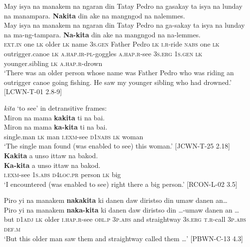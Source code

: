 \ea
May  isya  na  manakem  na  ngaran  din  Tatay  Pedro  na gasakay ta  isya  na  lunday  na  manampara. \textbf{Nakita}  din  ake  na  mangngod  na  nalemmes. \\\smallskip
\gll May  isya  na  manakem  na  ngaran  din  Tatay  Pedro  na ga-sakay ta  isya  na  lunday  na  ma-ng-tampara. \textbf{Na-kita}  din  ake  na  mangngod  na  na-lemmes. \\
\textsc{ext.in}  one  \textsc{lk}  older  \textsc{lk}  name  3\textsc{s.gen}  Father  Pedro  \textsc{lk}
\textsc{i.r}-ride   \textsc{nabs}  one  \textsc{lk}  outrigger.canoe  \textsc{lk}  \textsc{a.hap.ir-pl}-goggles
\textsc{a.hap.r}-see  3\textsc{s.erg}
1\textsc{s.gen} \textsc{lk}  younger.sibling  \textsc{lk}  \textsc{a.hap.r}-drown \\
\glt `There was an older person whose name was Father Pedro who was riding an outrigger canoe going fishing. He saw my younger sibling who had drowned.’ [LCWN-T-01 2.8-9]
\z

\ea
\textit{kita} ‘to see’ in detransitive frames: \\
Miron  na  mama  \textbf{kakita}  ti  na  bai. \\\smallskip
\gll Miron  na  mama  \textbf{ka-kita}  ti  na  bai. \\
single.man  \textsc{lk}  man  \textsc{i.exm}-see  \textsc{d1nabs}  \textsc{lk}  woman \\
\glt ‘The single man found (was enabled to see) this woman.’ [JCWN-T-25 2.18]
\z
\ea
\textbf{Kakita}  a  unso  ittaw  na  bakod. \\\smallskip
\gll \textbf{Ka-kita}  a  unso  ittaw  na  bakod. \\
\textsc{i.exm}-see  1\textsc{s.abs}  \textsc{d4loc.pr}  person  \textsc{lk}  big \\
\glt ‘I encountered (was enabled to see) right there a big person.’ [RCON-L-02 3.5]
\z

\newpage
\ea 
Piro  yi  na  manakem  \textbf{nakakita}  ki  danen  daw  diristso  din umaw  danen  an… \\\smallskip
\gll Piro  yi  na  manakem  \textbf{naka-kita}  ki  danen  daw  diristso  din  …-umaw  danen  an  … \\
but  \textsc{d}1\textsc{adj}  \textsc{lk}  older  \textsc{i.hap.r}-see  \textsc{obl.p}  3\textsc{p.abs}  and  straightway  3\textsc{s.erg}
\textsc{t.r}-call  3\textsc{p.abs}  \textsc{def.m} \\
\glt ‘But this older man saw them and straightway called them  …’ [PBWN-C-13 4.3]
\z  

